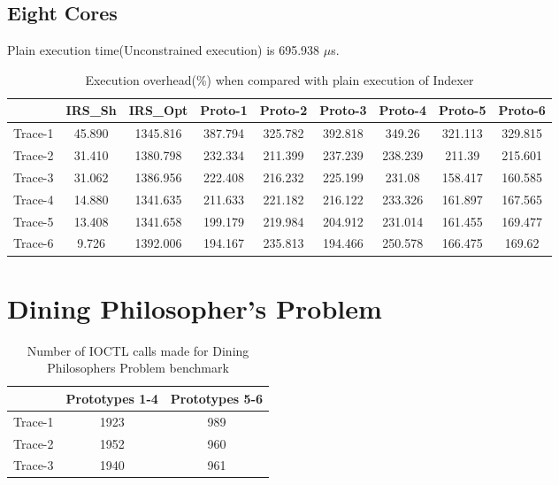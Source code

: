 \subsection{Eight Cores}
Plain execution time(Unconstrained execution) is 695.938 $\mu$s.
\begin{table}[h]
\begin{center}
 \begin{tabular}{|c c c c c c c c c|} 
 \hline
 & IRS\_Sh & IRS\_Opt& Proto-1 & Proto-2 & Proto-3 & Proto-4 & Proto-5 & Proto-6\\ %
 \hline
Trace-1 & 45.890 & 1345.816 & 387.794 & 325.782 & 392.818 & 349.26 & 321.113 & 329.815\\
Trace-2 & 31.410 & 1380.798 & 232.334 & 211.399 & 237.239 & 238.239 & 211.39 & 215.601\\
Trace-3 & 31.062 & 1386.956 & 222.408 & 216.232 & 225.199 & 231.08 & 158.417 & 160.585\\
Trace-4 & 14.880 & 1341.635 & 211.633 & 221.182 & 216.122 & 233.326 & 161.897 & 167.565\\
Trace-5 & 13.408 & 1341.658 & 199.179 & 219.984 & 204.912 & 231.014 & 161.455 & 169.477\\
Trace-6 & 9.726 & 1392.006 & 194.167 & 235.813 & 194.466 & 250.578 & 166.475 & 169.62\\
\hline
\end{tabular}
\end{center}
\caption{Execution overhead(\%) when compared with plain execution of Indexer}
\label{indexer_irs_res_cores_8}
\end{table}

\section{Dining Philosopher's Problem}

\begin{table}[h]
\begin{center}
 \begin{tabular}{|c c c|} 
 \hline
 & Prototypes 1-4 & Prototypes 5-6\\ %
 \hline
Trace-1 & 1923 & 989\\
Trace-2 & 1952 & 960\\
Trace-3 & 1940 & 961\\
\hline
\end{tabular}
\end{center}
\caption{Number of IOCTL calls made for Dining Philosophers Problem benchmark}
\label{dining_phil_num_syncs}

\end{table}

